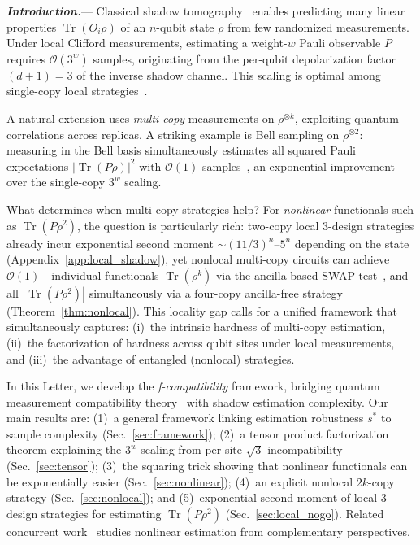 \documentclass[aps,%
twocolumn,%
floatfix,%
pra,%
amsfonts,%
groupedaddress,%
superscriptaddress]{revtex4-2}%
\DeclareMathOperator{\tr}{Tr}
\newcommand{\ox}{\otimes}
\newcommand{\1}{\mathbbm{1}}
\newcommand\prlsection[1]{\textit{\textbf{#1}}---}
\begin{document}
\prlsection{Introduction.}
Classical shadow tomography~\cite{huang2020predicting} enables predicting many linear properties $\tr(O_i\rho)$ of an $n$-qubit state $\rho$ from few randomized measurements. Under local Clifford measurements, estimating a weight-$w$ Pauli observable $P$ requires $\mathcal{O}(3^w)$ samples, originating from the per-qubit depolarization factor $(d+1) = 3$ of the inverse shadow channel. This scaling is optimal among single-copy local strategies~\cite{chen2024optimal}.

A natural extension uses \emph{multi-copy} measurements on $\rho^{\ox k}$, exploiting quantum correlations across replicas. A striking example is Bell sampling on $\rho^{\ox 2}$: measuring in the Bell basis simultaneously estimates all squared Pauli expectations $|\tr(P\rho)|^2$ with $\mathcal{O}(1)$ samples~\cite{hangleiter2024bell,montanaro2017learning}, an exponential improvement over the single-copy $3^w$ scaling.

What determines when multi-copy strategies help? For \emph{nonlinear} functionals such as $\tr(P\rho^2)$, the question is particularly rich: two-copy local 3-design strategies already incur exponential second moment $\sim (11/3)^n$--$5^n$ depending on the state (Appendix~\ref{app:local_shadow}), yet nonlocal multi-copy circuits can achieve $\mathcal{O}(1)$---individual functionals $\tr(\rho^k)$ via the ancilla-based SWAP test~\cite{ekert2002direct}, and all $|\tr(P\rho^2)|$ simultaneously via a four-copy ancilla-free strategy (Theorem~\ref{thm:nonlocal}). This locality gap calls for a unified framework that simultaneously captures:
(i)~the intrinsic hardness of multi-copy estimation,
(ii)~the factorization of hardness across qubit sites under local measurements, and
(iii)~the advantage of entangled (nonlocal) strategies.

In this Letter, we develop the \emph{f-compatibility} framework, bridging quantum measurement compatibility theory~\cite{heinosaari2015noise,designolle2019incompatibility,Busch1986} with shadow estimation complexity. Our main results are: (1)~a general framework linking estimation robustness $s^*$ to sample complexity (Sec.~\ref{sec:framework}); (2)~a tensor product factorization theorem explaining the $3^w$ scaling from per-site $\sqrt{3}$ incompatibility (Sec.~\ref{sec:tensor}); (3)~the squaring trick showing that nonlinear functionals can be exponentially easier (Sec.~\ref{sec:nonlinear}); (4)~an explicit nonlocal $2k$-copy strategy (Sec.~\ref{sec:nonlocal}); and (5)~exponential second moment of local 3-design strategies for estimating $\tr(P\rho^2)$ (Sec.~\ref{sec:local_nogo}). Related concurrent work~\cite{chen2025simultaneous,ye2025replica,du2025optimal} studies nonlinear estimation from complementary perspectives.
\end{document}
